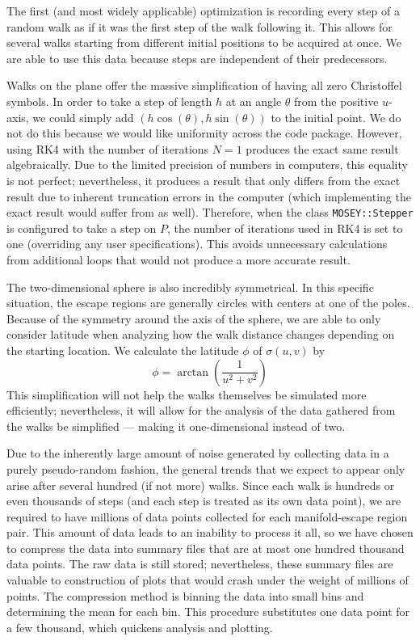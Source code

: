 \documentclass{article}
\begin{document}
		The first (and most widely applicable) optimization is recording every step of a random walk as if it was the first step of the walk following it.
		This allows for several walks starting from different initial positions to be acquired at once.
		We are able to use this data because steps are independent of their predecessors.
		
		Walks on the plane offer the massive simplification of having all zero Christoffel symbols.
		In order to take a step of length $h$ at an angle $\theta$ from the positive $u$-axis, we could simply add $(h\cos(\theta), h\sin(\theta))$ to the initial point.
		We do not do this because we would like uniformity across the code package.
		However, using RK4 with the number of iterations $N = 1$ produces the exact same result algebraically.
		Due to the limited precision of numbers in computers, this equality is not perfect; nevertheless, it produces a result that only differs from the exact result due to inherent truncation errors in the computer (which implementing the exact result would suffer from as well).
		Therefore, when the class \texttt{MOSEY::Stepper} is configured to take a step on $P$, the number of iterations used in RK4 is set to one (overriding any user specifications).
		This avoids unnecessary calculations from additional loops that would not produce a more accurate result.
		
		The two-dimensional sphere is also incredibly symmetrical.
		In this specific situation, the escape regions are generally circles with centers at one of the poles.
		Because of the symmetry around the axis of the sphere, we are able to only consider latitude when analyzing how the walk distance changes depending on the starting location.
		We calculate the latitude $\phi$ of $\sigma(u,v)$ by
		\begin{equation*}
			\phi = \arctan\left(\frac{1}{u^2+v^2}\right)
		\end{equation*}
		This simplification will not help the walks themselves be simulated more efficiently; nevertheless, it will allow for the analysis of the data gathered from the walks be simplified --- making it one-dimensional instead of two.
		
		Due to the inherently large amount of noise generated by collecting data in a purely pseudo-random fashion, the general trends that we expect to appear only arise after several hundred (if not more) walks.
		Since each walk is hundreds or even thousands of steps (and each step is treated as its own data point), we are required to have millions of data points collected for each manifold-escape region pair.
		This amount of data leads to an inability to process it all, so we have chosen to compress the data into summary files that are at most one hundred thousand data points.
		The raw data is still stored; nevertheless, these summary files are valuable to construction of plots that would crash under the weight of millions of points.
		The compression method is binning the data into small bins and determining the mean for each bin.
		This procedure substitutes one data point for a few thousand, which quickens analysis and plotting.
\end{document}

